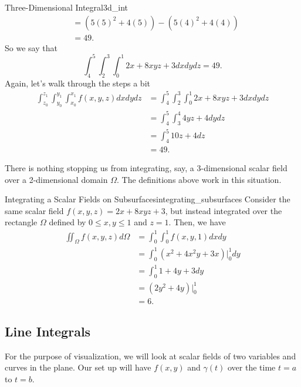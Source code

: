 \begin{ex}{Three-Dimensional Integral}{3d_int}
\begin{align*}
             	            &= (5(5)^2+4(5))-(5(4)^2+4(4))\\
             	            &=49.
             	        \end{align*}
             	        So we say that
             	        \[
             	        \int_4^5 \int_2^3 \int_0^1 2x+8xyz+3dxdydz = 49.
             	        \]
             	        Again, let's walk through the steps a bit
             	        \begin{align*}
             	            \int_{z_0}^{z_1}\int_{y_0}^{y_1}\int_{x_0}^{x_1} f(x,y,z)dxdydz &= \int_4^5 \int_2^3 \int_0^1 2x+8xyz+3dxdydz\\
             	            &= \int_4^5 \int_3^4 4yz+4dydz\\
             	            &= \int_4^5 10z+4dz\\
             	            &= 49.
             	        \end{align*}
             	        \end{ex}

             	       \begin{remark}
             	       There is nothing stopping us from integrating, say, a 3-dimensional scalar field over a 2-dimensional domain $\Omega$. The definitions above work in this situation.
             	       \end{remark}

             	       \begin{ex}{Integrating a Scalar Fields on Subsurfaces}{integrating_subsurfaces}
                			Consider the same scalar field $f(x,y,z) = 2x + 8xyz + 3$, but instead integrated over the rectangle $\Omega$ defined by $0\leq x,y \leq 1$ and $z=1$.  Then, we have
                			\begin{align*}
                				\iint_\Omega f(x,y,z)d\Omega &= \int_0^1 \int_0^1 f(x,y,1)dxdy\\
                				&= \int_0^1 \left(x^2 + 4x^2y+3x\right)\vert_0^1 dy\\
                				&= \int_0^1 1+4y+3 dy\\
                				&= \left(2y^2 + 4y\right)\vert_0^1\\
                				&= 6.
                			\end{align*}
                		\end{ex}

                \subsection{Line Integrals}
                       For the purpose of visualization, we will look at scalar fields of two variables and curves in the plane.  Our set up will have $f(x,y)$ and $\gamma(t)$ over the time $t=a$ to $t=b$.

